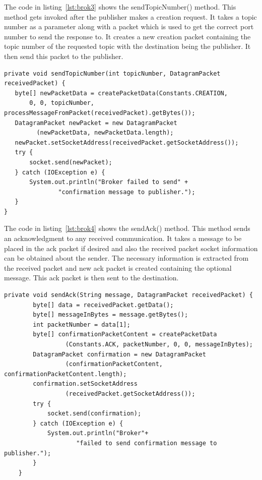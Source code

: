 \documentclass{article}
\begin{document}
The code in listing~\ref{lst:brok3} shows the sendTopicNumber() method. This method gets invoked after the publisher makes a creation request. It takes a topic number as a parameter along with a packet which is used to get the correct port number to send the response to. It creates a new creation packet containing the topic number of the requested topic with the destination being the publisher. It then send this packet to the publisher.

\begin{lstlisting}[caption={[Sample Code 2]onReceipt() method, handles packets received on the publishers port}, label={lst:brok3}]
private void sendTopicNumber(int topicNumber, DatagramPacket receivedPacket) {
   byte[] newPacketData = createPacketData(Constants.CREATION, 
       0, 0, topicNumber, processMessageFromPacket(receivedPacket).getBytes());
   DatagramPacket newPacket = new DatagramPacket
         (newPacketData, newPacketData.length);
   newPacket.setSocketAddress(receivedPacket.getSocketAddress());
   try {
	   socket.send(newPacket);
   } catch (IOException e) {
	   System.out.println("Broker failed to send" +
               "confirmation message to publisher.");
   }
}
\end{lstlisting}

The code in listing~\ref{lst:brok4} shows the sendAck() method. This method sends an acknowledgment to any received communication. It takes a message to be placed in the ack packet if desired and also the received packet socket information can be obtained about the sender. The necessary information is extracted from the received packet and new ack packet is created containing the optional message. This ack packet is then sent to the destination.

\begin{lstlisting}[caption={[Sample Code 2]onReceipt() method, handles packets received on the publishers port}, label={lst:brok4}]
private void sendAck(String message, DatagramPacket receivedPacket) {
		byte[] data = receivedPacket.getData();
		byte[] messageInBytes = message.getBytes();
		int packetNumber = data[1];
		byte[] confirmationPacketContent = createPacketData
                 (Constants.ACK, packetNumber, 0, 0, messageInBytes);
		DatagramPacket confirmation = new DatagramPacket
                 (confirmationPacketContent, confirmationPacketContent.length);
		confirmation.setSocketAddress
                 (receivedPacket.getSocketAddress());
		try {
			socket.send(confirmation);
		} catch (IOException e) {
			System.out.println("Broker"+ 
                    "failed to send confirmation message to publisher.");
		}
	}
\end{lstlisting}
\end{document}
